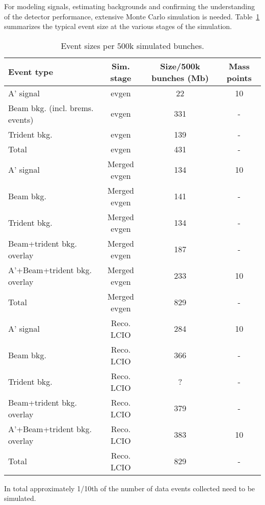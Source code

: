 For modeling signals, estimating backgrounds and confirming the understanding of the detector 
performance, extensive Monte Carlo simulation is needed. Table~\ref{tab:mc_event_size} summarizes 
the typical event size at the various stages of the simulation. 
\begin{table}[]
\centering
\begin{tabular}{|lccc|}
\hline
Event type & Sim. stage & Size/500k bunches (Mb) & Mass points  \\
\hline 
A' signal & evgen & 22 & 10  \\
Beam bkg. (incl. brems. events) & evgen & 331 & -\\ 
Trident bkg. & evgen & 139 & - \\
\hline
Total & evgen & 431 & -\\
\hline
A' signal & Merged evgen & 134 & 10 \\
Beam bkg. & Merged evgen & 141 & - \\ 
Trident bkg. & Merged evgen & 134 & - \\
Beam+trident bkg. overlay & Merged evgen & 187 & - \\ 
A'+Beam+trident bkg. overlay & Merged evgen & 233 & 10 \\ 
\hline
Total & Merged evgen & 829 & - \\
\hline
A' signal & Reco. LCIO  & 284 & 10 \\
Beam bkg. & Reco. LCIO  & 366 & - \\ 
Trident bkg. & Reco. LCIO  & ? & - \\
Beam+trident bkg. overlay & Reco. LCIO  & 379 & - \\ 
A'+Beam+trident bkg. overlay & Reco. LCIO  & 383 & 10 \\ 
\hline
Total & Reco. LCIO  & 829 & - \\
\hline
\end{tabular}
\caption{{\small Event sizes per 500k simulated bunches. }}
\label{tab:mc_event_size}
\end{table}
%
%
In total approximately 1/10th of the number of data events collected need to be simulated. 

